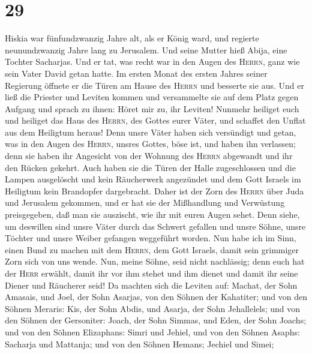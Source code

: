 \hypertarget{section-28}{%
\section{29}\label{section-28}}

 Hiskia war fünfundzwanzig Jahre alt, als er König ward,
und regierte neunundzwanzig Jahre lang zu Jerusalem. Und seine Mutter
hieß Abija, eine Tochter Sacharjas.  Und er tat, was recht
war in den Augen des \textsc{Herrn}, ganz wie sein Vater David getan
hatte.  Im ersten Monat des ersten Jahres seiner Regierung
öffnete er die Türen am Hause des \textsc{Herrn} und besserte sie aus.
 Und er ließ die Priester und Leviten kommen und
versammelte sie auf dem Platz gegen Aufgang und sprach zu ihnen:
 Höret mir zu, ihr Leviten! Nunmehr heiliget euch und
heiliget das Haus des \textsc{Herrn}, des Gottes eurer Väter, und
schaffet den Unflat aus dem Heiligtum heraus!  Denn unsre
Väter haben sich versündigt und getan, was in den Augen des
\textsc{Herrn}, unsres Gottes, böse ist, und haben ihn verlassen; denn
sie haben ihr Angesicht von der Wohnung des \textsc{Herrn} abgewandt und
ihr den Rücken gekehrt.  Auch haben sie die Türen der
Halle zugeschlossen und die Lampen ausgelöscht und kein Räucherwerk
angezündet und dem Gott Israels im Heiligtum kein Brandopfer
dargebracht.  Daher ist der Zorn des \textsc{Herrn} über
Juda und Jerusalem gekommen, und er hat sie der Mißhandlung und
Verwüstung preisgegeben, daß man sie auszischt, wie ihr mit euren Augen
sehet.  Denn siehe, um deswillen sind unsre Väter durch
das Schwert gefallen und unsre Söhne, unsre Töchter und unsre Weiber
gefangen weggeführt worden.  Nun habe ich im Sinn, einen
Bund zu machen mit dem \textsc{Herrn}, dem Gott Israels, damit sein
grimmiger Zorn sich von uns wende.  Nun, meine Söhne,
seid nicht nachlässig; denn euch hat der \textsc{Herr} erwählt, damit
ihr vor ihm stehet und ihm dienet und damit ihr seine Diener und
Räucherer seid!  Da machten sich die Leviten auf: Machat,
der Sohn Amasais, und Joel, der Sohn Asarjas, von den Söhnen der
Kahatiter; und von den Söhnen Meraris: Kis, der Sohn Abdis, und Asarja,
der Sohn Jehallelels; und von den Söhnen der Gersoniter: Joach, der Sohn
Simmas, und Eden, der Sohn Joachs;  und von den Söhnen
Elizaphans: Simri und Jehiel, und von den Söhnen Asaphs: Sacharja und
Mattanja;  und von den Söhnen Hemans; Jechiel und Simei;
